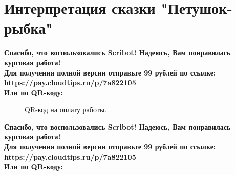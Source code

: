 \documentclass{article}
\begin{document}
\section{Интерпретация сказки "Петушок-рыбка"}
\begin{center}
    \textbf{
        Спасибо, что воспользовались Scribot! Надеюсь, Вам понравилась курсовая работа!\\
        Для получения полной версии отправьте 99 рублей по ссылке:\\
        https://pay.cloudtips.ru/p/7a822105\\
        Или по QR-коду:\\
    }
\end{center}
\begin{figure}[h]
    \caption{QR-код на оплату работы.}
    \label{ris:image}
\end{figure}
\newpage
\begin{center}
    \textbf{
        Спасибо, что воспользовались Scribot! Надеюсь, Вам понравилась курсовая работа!\\
        Для получения полной версии отправьте 99 рублей по ссылке:\\
        https://pay.cloudtips.ru/p/7a822105\\
        Или по QR-коду:\\
    }
\end{center}
\end{document}
